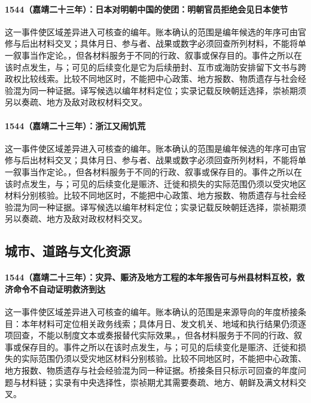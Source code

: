 \paragraph{1544（嘉靖二十三年）：日本对明朝中国的使团：明朝官员拒绝会见日本使节} 这一事件使区域差异进入可核查的编年。账本确认的范围是编年候选的年序可由官修与后出材料交叉；具体月日、参与者、战果或数字必须回查所列材料，不能将单一叙事当作定论。，但各材料服务于不同的行政、叙事或保存目的。事件之所以在该时点发生，与；可见的后续变化是它为后续册封、互市或海防安排留下文书与跨政权比较线索。比较不同地区时，不能把中心政策、地方报数、物质遗存与社会经验混为同一种证据。译写候选以编年材料定位；实录记载反映朝廷选择，崇祯期须另以奏疏、地方及敌对政权材料交叉。

\paragraph{1544（嘉靖二十三年）：浙江又闹饥荒} 这一事件使区域差异进入可核查的编年。账本确认的范围是编年候选的年序可由官修与后出材料交叉；具体月日、参与者、战果或数字必须回查所列材料，不能将单一叙事当作定论。，但各材料服务于不同的行政、叙事或保存目的。事件之所以在该时点发生，与；可见的后续变化是赈济、迁徙和损失的实际范围仍须以受灾地区材料分别核验。比较不同地区时，不能把中心政策、地方报数、物质遗存与社会经验混为同一种证据。译写候选以编年材料定位；实录记载反映朝廷选择，崇祯期须另以奏疏、地方及敌对政权材料交叉。

\subsection{城市、道路与文化资源}

\paragraph{1544（嘉靖二十三年）：灾异、赈济及地方工程的本年报告可与州县材料互校，救济命令不自动证明救济到达} 这一事件使区域差异进入可核查的编年。账本确认的范围是来源导向的年度桥接条目：本年材料可定位相关政务线索；具体月日、发文机关、地域和执行结果仍须逐项回查，不能以制度文本或奏报替代实际效果。，但各材料服务于不同的行政、叙事或保存目的。事件之所以在该时点发生，与；可见的后续变化是赈济、迁徙和损失的实际范围仍须以受灾地区材料分别核验。比较不同地区时，不能把中心政策、地方报数、物质遗存与社会经验混为同一种证据。桥接条目只标示可回查的年度问题与材料链；实录有中央选择性，崇祯期尤其需要奏疏、地方、朝鲜及满文材料交叉。

